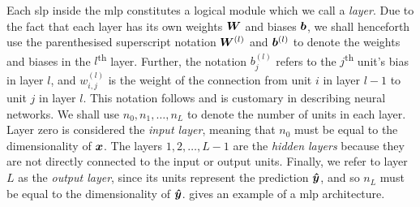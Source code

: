\documentclass[../report.tex]{subfiles}
\begin{document}
Each \gls{slp} inside the \gls{mlp} constitutes a logical module which we call a \emph{layer}.
Due to the fact that each layer has its own weights ${\bm{W}}$ and biases ${\bm{b}}$, we shall henceforth use the parenthesised superscript notation ${\bm{W}}^{(l)}$ and ${\bm{b}}^{(l)}$ to denote the weights and biases in the $l$\textsuperscript{th} layer.
Further, the notation $b_j^{(l)}$ refers to the $j$\textsuperscript{th} unit's bias in layer $l$, and $w_{i,j}^{(l)}$ is the weight of the connection from unit $i$ in layer $l-1$ to unit $j$ in layer $l$.
This notation follows \textcite{goodfellow2016} and is customary in describing neural networks.
We shall use $n_0,n_1,\dots,n_L$ to denote the number of units in each layer.
Layer zero is considered the \emph{input layer}, meaning that $n_0$ must be equal to the dimensionality of ${\bm{x}}$. 
The layers $1, 2, \dots, L-1$ are the \emph{hidden layers} because they are not directly connected to the input or output units.
Finally, we refer to layer $L$ as the \emph{output layer}, since its units represent the prediction ${\bm{\hat{y}}}$, and so $n_L$ must be equal to the dimensionality of ${\bm{\hat{y}}}$. 
 gives an example of a \gls{mlp} architecture.
\end{document}
